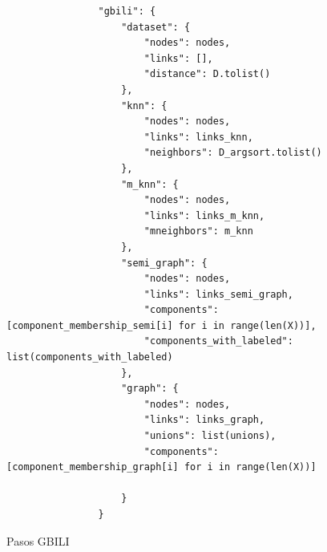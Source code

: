 \begin{figure}[h!]
    \centering
    \begin{minipage}{0.9\linewidth}
        \begin{center}
            \begin{lstlisting}
                "gbili": {
                    "dataset": {
                        "nodes": nodes,
                        "links": [],
                        "distance": D.tolist()
                    },
                    "knn": {
                        "nodes": nodes,
                        "links": links_knn,
                        "neighbors": D_argsort.tolist()
                    },
                    "m_knn": {
                        "nodes": nodes,
                        "links": links_m_knn,
                        "mneighbors": m_knn
                    },
                    "semi_graph": {
                        "nodes": nodes,
                        "links": links_semi_graph,
                        "components": [component_membership_semi[i] for i in range(len(X))],
                        "components_with_labeled": list(components_with_labeled)
                    },
                    "graph": {
                        "nodes": nodes,
                        "links": links_graph,
                        "unions": list(unions),
                        "components": [component_membership_graph[i] for i in range(len(X))]
        
                    }
                }
            \end{lstlisting}
        \end{center}
    \end{minipage}
    \caption{Pasos GBILI}
    \label{fig:pasos-gbili}
\end{figure}

